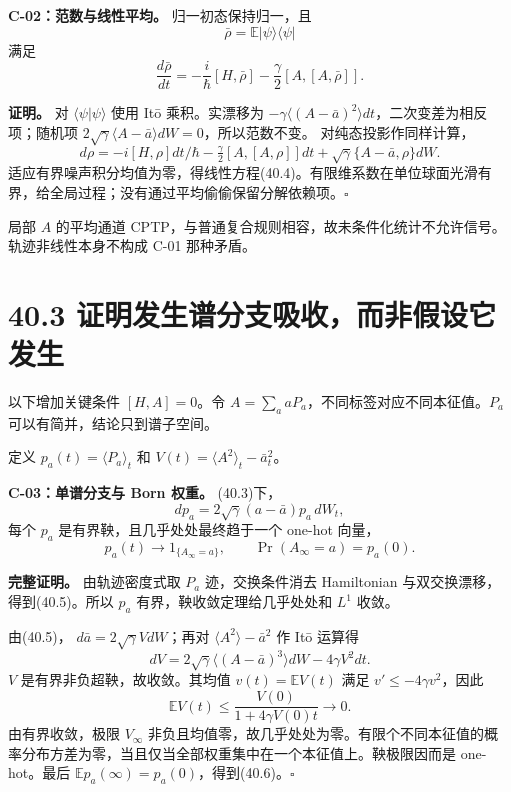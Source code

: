 \documentclass[
  11pt,
  oneside]{book}
\begin{document}
\protect\hypertarget{c-02}{}{}

\textbf{C-02：范数与线性平均。} 归一初态保持归一，且 \[
\bar\rho=\mathbb E|\psi\rangle\langle\psi|
\] 满足 \[
\frac{d\bar\rho}{dt}
=-\frac{i}{\hbar}[H,\bar\rho]
-\frac{\gamma}{2}[A,[A,\bar\rho]].
\tag{40.4}
\]

\textbf{证明。} 对 \(\langle\psi|\psi\rangle\) 使用 Itō 乘积。实漂移为
\(-\gamma\langle(A-\bar a)^2\rangle dt\)，二次变差为相反项；随机项
\(2\sqrt\gamma\langle A-\bar a\rangle dW=0\)，所以范数不变。
对纯态投影作同样计算， \[
d\rho=-i[H,\rho]dt/\hbar-\tfrac\gamma2[A,[A,\rho]]dt
+\sqrt\gamma\{A-\bar a,\rho\}dW.
\]
适应有界噪声积分均值为零，得线性方程(40.4)。有限维系数在单位球面光滑有界，给全局过程；没有通过平均偷偷保留分解依赖项。\(\square\)

局部 \(A\) 的平均通道
CPTP，与普通复合规则相容，故未条件化统计不允许信号。轨迹非线性本身不构成
C-01 那种矛盾。

\hypertarget{ux8bc1ux660eux53d1ux751fux8c31ux5206ux652fux5438ux6536ux800cux975eux5047ux8bbeux5b83ux53d1ux751f}{%
\section{40.3
证明发生谱分支吸收，而非假设它发生}\label{ux8bc1ux660eux53d1ux751fux8c31ux5206ux652fux5438ux6536ux800cux975eux5047ux8bbeux5b83ux53d1ux751f}}

以下增加关键条件 \([H,A]=0\)。令
\(A=\sum_a aP_a\)，不同标签对应不同本征值。\(P_a\)
可以有简并，结论只到谱子空间。

定义 \(p_a(t)=\langle P_a\rangle_t\) 和
\(V(t)=\langle A^2\rangle_t-\bar a_t^2\)。

\protect\hypertarget{c-03}{}{}

\textbf{C-03：单谱分支与 Born 权重。} (40.3)下， \[
dp_a=2\sqrt\gamma(a-\bar a)p_a\,dW_t,
\tag{40.5}
\] 每个 \(p_a\) 是有界鞅，且几乎处处最终趋于一个 one-hot 向量， \[
p_a(t)\longrightarrow 1_{\{A_\infty=a\}},\qquad
\Pr(A_\infty=a)=p_a(0).
\tag{40.6}
\]

\textbf{完整证明。} 由轨迹密度式取 \(P_a\) 迹，交换条件消去 Hamiltonian
与双交换漂移，得到(40.5)。所以 \(p_a\) 有界，鞅收敛定理给几乎处处和
\(L^1\) 收敛。

由(40.5)， \(d\bar a=2\sqrt\gamma VdW\)；再对
\(\langle A^2\rangle-\bar a^2\) 作 Itō 运算得 \[
dV=2\sqrt\gamma\langle(A-\bar a)^3\rangle dW
-4\gamma V^2dt.
\tag{40.7}
\] \(V\) 是有界非负超鞅，故收敛。其均值 \(v(t)=\mathbb EV(t)\) 满足
\(v'\le-4\gamma v^2\)，因此 \[
\mathbb EV(t)\le\frac{V(0)}{1+4\gamma V(0)t}\longrightarrow0.
\tag{40.8}
\] 由有界收敛，极限 \(V_\infty\)
非负且均值零，故几乎处处为零。有限个不同本征值的概率分布方差为零，当且仅当全部权重集中在一个本征值上。鞅极限因而是
one-hot。最后 \(\mathbb E p_a(\infty)=p_a(0)\)，得到(40.6)。\(\square\)
\end{document}
